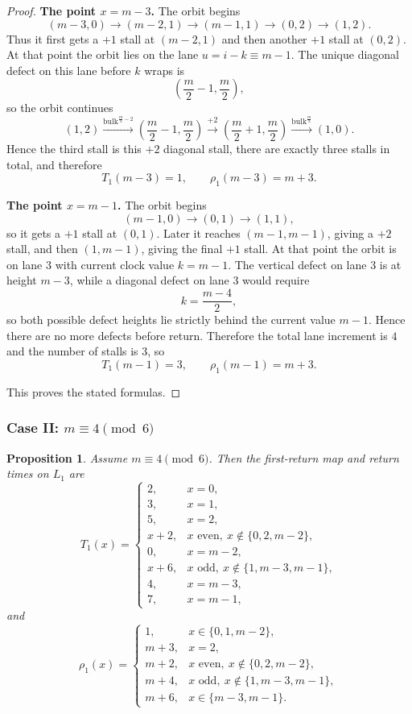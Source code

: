 \documentclass[11pt]{article}
\newtheorem{proposition}{Proposition}
\newcommand{\bulk}{\mathrm{bulk}}   %
\begin{document}
\begin{proof}
\smallskip
\noindent\textbf{The point $x=m-3$.}
The orbit begins
\[
(m-3,0)\to (m-2,1)\to (m-1,1)\to (0,2)\to (1,2).
\]
Thus it first gets a $+1$ stall at $(m-2,1)$ and then another $+1$ stall at $(0,2)$.
At that point the orbit lies on the lane $u=i-k\equiv m-1$.
The unique diagonal defect on this lane before $k$ wraps is
\[
\left(\frac m2-1,\frac m2\right),
\]
so the orbit continues
\[
(1,2)\xrightarrow{\bulk^{\frac m2-2}}\left(\frac m2-1,\frac m2\right)
\xrightarrow{+2}\left(\frac m2+1,\frac m2\right)
\xrightarrow{\bulk^{\frac m2}}(1,0).
\]
Hence the third stall is this $+2$ diagonal stall, there are exactly three stalls in total, and therefore
\[
T_1(m-3)=1,\qquad \rho_1(m-3)=m+3.
\]

\smallskip
\noindent\textbf{The point $x=m-1$.}
The orbit begins
\[
(m-1,0)\to (0,1)\to (1,1),
\]
so it gets a $+1$ stall at $(0,1)$.
Later it reaches $(m-1,m-1)$, giving a $+2$ stall, and then $(1,m-1)$, giving the final $+1$ stall.
At that point the orbit is on lane $3$ with current clock value $k=m-1$.
The vertical defect on lane $3$ is at height $m-3$, while a diagonal defect on lane $3$ would require
\[
k=\frac{m-4}{2},
\]
so both possible defect heights lie strictly behind the current value $m-1$.
Hence there are no more defects before return.
Therefore the total lane increment is $4$ and the number of stalls is $3$, so
\[
T_1(m-1)=3,\qquad \rho_1(m-1)=m+3.
\]

This proves the stated formulas.
\end{proof}

\subsubsection{Case II: $m\equiv 4\pmod 6$}

\begin{proposition}\label{prop:R1-caseII}
Assume $m\equiv 4\pmod 6$.
Then the first-return map and return times on $L_1$ are
\[
T_1(x)=
\begin{cases}
2,&x=0,\\
3,&x=1,\\
5,&x=2,\\
x+2,&x\text{ even},\ x\notin\{0,2,m-2\},\\
0,&x=m-2,\\
x+6,&x\text{ odd},\ x\notin\{1,m-3,m-1\},\\
4,&x=m-3,\\
7,&x=m-1,
\end{cases}
\]
and
\[
\rho_1(x)=
\begin{cases}
1,&x\in\{0,1,m-2\},\\
m+3,&x=2,\\
m+2,&x\text{ even},\ x\notin\{0,2,m-2\},\\
m+4,&x\text{ odd},\ x\notin\{1,m-3,m-1\},\\
m+6,&x\in\{m-3,m-1\}.
\end{cases}
\]
\end{proposition}
\end{document}
